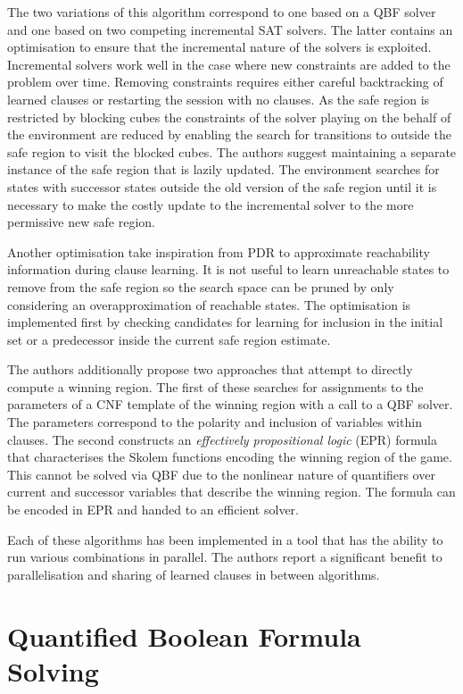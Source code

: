 The two variations of this algorithm correspond to one based on a QBF solver and one based on two competing incremental SAT solvers. The latter contains an optimisation to ensure that the incremental nature of the solvers is exploited. Incremental solvers work well in the case where new constraints are added to the problem over time. Removing constraints requires either careful backtracking of learned clauses or restarting the session with no clauses. As the safe region is restricted by blocking cubes the constraints of the solver playing on the behalf of the environment are reduced by enabling the search for transitions to outside the safe region to visit the blocked cubes. The authors suggest maintaining a separate instance of the safe region that is lazily updated. The environment searches for states with successor states outside the old version of the safe region until it is necessary to make the costly update to the incremental solver to the more permissive new safe region.

Another optimisation take inspiration from PDR to approximate reachability information during clause learning. It is not useful to learn unreachable states to remove from the safe region so the search space can be pruned by only considering an overapproximation of reachable states. The optimisation is implemented first by checking candidates for learning for inclusion in the initial set or a predecessor inside the current safe region estimate.

The authors additionally propose two approaches that attempt to directly compute a winning region. The first of these searches for assignments to the parameters of a CNF template of the winning region with a call to a QBF solver. The parameters correspond to the polarity and inclusion of variables within clauses. The second constructs an \emph{effectively propositional logic} (EPR) formula that characterises the Skolem functions encoding the winning region of the game. This cannot be solved via QBF due to the nonlinear nature of quantifiers over current and successor variables that describe the winning region. The formula can be encoded in EPR and handed to an efficient solver.

Each of these algorithms has been implemented in a tool that has the ability to run various combinations in parallel. The authors report a significant benefit to parallelisation and sharing of learned clauses in between algorithms.

\section{Quantified Boolean Formula Solving}


